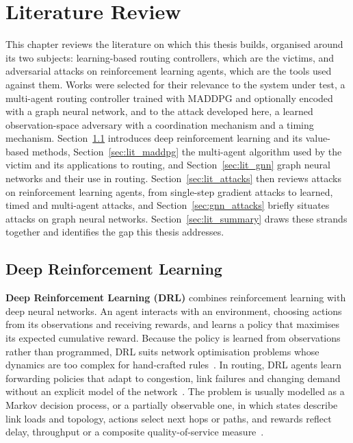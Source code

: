 
%

\chapter{Literature Review}
\label{cha:literature_review}

This chapter reviews the literature on which this thesis builds, organised around its
two subjects: learning-based routing controllers, which are the victims, and adversarial
attacks on reinforcement learning agents, which are the tools used against them. Works
were selected for their relevance to the system under test, a multi-agent routing
controller trained with MADDPG and optionally encoded with a graph neural network, and to
the attack developed here, a learned observation-space adversary with a coordination
mechanism and a timing mechanism. Section~\ref{sec:lit_drl} introduces deep
reinforcement learning and its value-based methods, Section~\ref{sec:lit_maddpg} the
multi-agent algorithm used by the victim and its applications to routing, and
Section~\ref{sec:lit_gnn} graph neural networks and their use in routing.
Section~\ref{sec:lit_attacks} then reviews attacks on reinforcement learning agents,
from single-step gradient attacks to learned, timed and multi-agent attacks, and
Section~\ref{sec:gnn_attacks} briefly situates attacks on graph neural networks.
Section~\ref{sec:lit_summary} draws these strands together and identifies the gap this
thesis addresses.

\section{Deep Reinforcement Learning}
\label{sec:lit_drl}

\textbf{Deep Reinforcement Learning (DRL)} combines reinforcement learning with deep
neural networks. An agent interacts with an environment, choosing actions from its
observations and receiving rewards, and learns a policy that maximises its expected
cumulative reward. Because the policy is learned from observations rather than
programmed, DRL suits network optimisation problems whose dynamics are too complex for
hand-crafted rules~\cite{theodoropoulos2023multi,10535707,lozanocuadra2024opensourcemultiagentdeep}.
In routing, DRL agents learn forwarding policies that adapt to congestion, link failures
and changing demand without an explicit model of the
network~\cite{11227800,10730787,11122503}. The problem is usually modelled as a Markov
decision process, or a partially observable one, in which states describe link loads
and topology, actions select next hops or paths, and rewards reflect delay, throughput or
a composite quality-of-service measure~\cite{10684240}.

